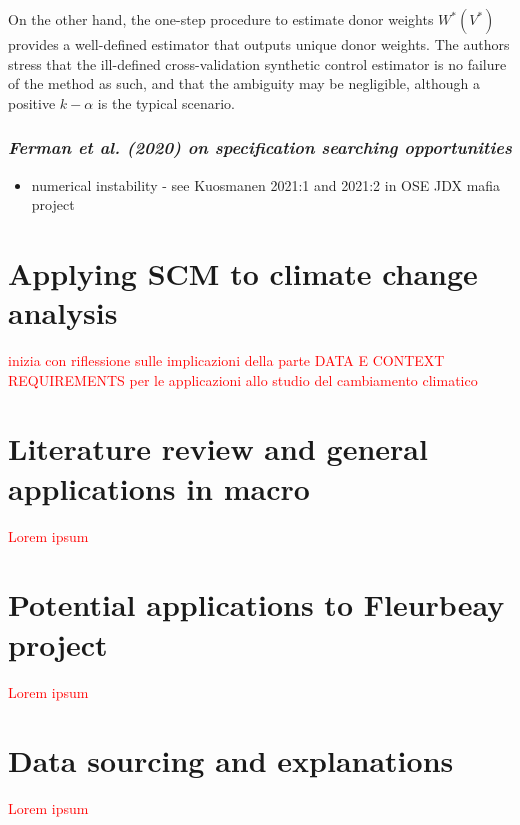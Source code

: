 \documentclass[12pt,a4paper,draft]{article}
\begin{document}
On the other hand, the one-step procedure to estimate donor weights $W^*(V^*)$ 
provides a well-defined estimator that outputs unique donor weights. The authors 
stress that the ill-defined cross-validation synthetic control estimator is no 
failure of the method as such, and that the ambiguity may be negligible, although 
a positive $k-\alpha$ is the typical scenario.




\subsubsection*{\emph{Ferman et al. (2020) on specification searching opportunities}}





\begin{itemize}
    \item numerical instability -  see Kuosmanen 2021:1 and 2021:2 in OSE JDX mafia project
\end{itemize}

\section{Applying SCM to climate change analysis}
\textcolor{red}{inizia con riflessione sulle implicazioni della parte DATA E CONTEXT
REQUIREMENTS per le applicazioni allo studio del cambiamento climatico}


\section{Literature review and general applications in macro}
\textcolor{red}{Lorem ipsum}




\section{Potential applications to Fleurbeay project}
\textcolor{red}{Lorem ipsum}




\section{Data sourcing and explanations}
\textcolor{red}{Lorem ipsum}
\end{document}
